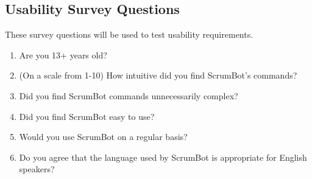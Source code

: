\documentclass[12pt, titlepage]{article}
\begin{document}
\subsection{Usability Survey Questions}
These survey questions will be used to test usability requirements.
\begin{enumerate}
    \item Are you 13+ years old?
    \item (On a scale from 1-10) How intuitive did you find ScrumBot's commands?
    \item Did you find ScrumBot commands unnecessarily complex?
    \item Did you find ScrumBot easy to use?
    \item Would you use ScrumBot on a regular basis?
    \item Do you agree that the language used by ScrumBot is appropriate for English speakers?
\end{enumerate}
\end{document}
